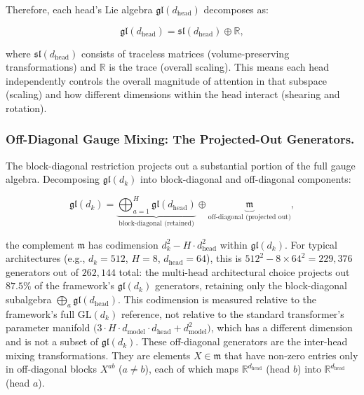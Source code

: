 \documentclass[twoside,11pt]{article}
\begin{document}
Therefore, each head's Lie algebra $\mathfrak{gl}(d_{\text{head}})$ decomposes as:

\begin{equation}
\mathfrak{gl}(d_{\text{head}}) = \mathfrak{sl}(d_{\text{head}}) \oplus \mathbb{R},
\end{equation}

where $\mathfrak{sl}(d_{\text{head}})$ consists of traceless matrices (volume-preserving transformations) and $\mathbb{R}$ is the trace (overall scaling). This means each head independently controls the overall magnitude of attention in that subspace (scaling) and how different dimensions within the head interact (shearing and rotation).

\subsubsection{Off-Diagonal Gauge Mixing: The Projected-Out Generators.}
\label{sec:off_diagonal_mixing}

The block-diagonal restriction projects out a substantial portion of the full gauge algebra. Decomposing $\mathfrak{gl}(d_k)$ into block-diagonal and off-diagonal components:

\begin{equation}
\mathfrak{gl}(d_k) = \underbrace{\bigoplus_{a=1}^{H} \mathfrak{gl}(d_{\text{head}})}_{\text{block-diagonal (retained)}} \oplus \underbrace{\mathfrak{m}}_{\text{off-diagonal (projected out)}},
\label{eq:lie_algebra_decomposition}
\end{equation}

the complement $\mathfrak{m}$ has codimension $d_k^2 - H \cdot d_{\text{head}}^2$ within $\mathfrak{gl}(d_k)$. For typical architectures (e.g., $d_k = 512$, $H = 8$, $d_{\text{head}} = 64$), this is $512^2 - 8 \times 64^2 = 229{,}376$ generators out of $262{,}144$ total: the multi-head architectural choice projects out $87.5\%$ of the framework's $\mathfrak{gl}(d_k)$ generators, retaining only the block-diagonal subalgebra $\bigoplus_a \mathfrak{gl}(d_{\text{head}})$. This codimension is measured relative to the framework's full $\mathrm{GL}(d_k)$ reference, not relative to the standard transformer's parameter manifold $\big(3 \cdot H \cdot d_{\text{model}} \cdot d_{\text{head}} + d_{\text{model}}^2\big)$, which has a different dimension and is not a subset of $\mathfrak{gl}(d_k)$. These off-diagonal generators are the inter-head mixing transformations. They are elements $X \in \mathfrak{m}$ that have non-zero entries only in off-diagonal blocks $X^{ab}$ ($a \neq b$), each of which maps $\mathbb{R}^{d_{\text{head}}}$ (head $b$) into $\mathbb{R}^{d_{\text{head}}}$ (head $a$).
\end{document}
